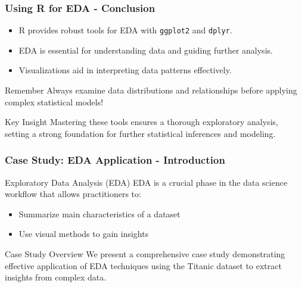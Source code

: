 \documentclass[aspectratio=169]{beamer}
\begin{document}
\begin{frame}[fragile]
    \frametitle{Using R for EDA - Conclusion}
    \begin{itemize}
        \item R provides robust tools for EDA with \texttt{ggplot2} and \texttt{dplyr}.
        \item EDA is essential for understanding data and guiding further analysis.
        \item Visualizations aid in interpreting data patterns effectively.
    \end{itemize}
    \begin{block}{Remember}
        Always examine data distributions and relationships before applying complex statistical models!
    \end{block}
    \begin{block}{Key Insight}
        Mastering these tools ensures a thorough exploratory analysis, setting a strong foundation for further statistical inferences and modeling.
    \end{block}
\end{frame}

\begin{frame}[fragile]
    \frametitle{Case Study: EDA Application - Introduction}
    \begin{block}{Exploratory Data Analysis (EDA)}
        EDA is a crucial phase in the data science workflow that allows practitioners to:
        \begin{itemize}
            \item Summarize main characteristics of a dataset
            \item Use visual methods to gain insights
        \end{itemize}
    \end{block}
    \begin{block}{Case Study Overview}
        We present a comprehensive case study demonstrating effective application of EDA techniques using the Titanic dataset to extract insights from complex data.
    \end{block}
\end{frame}
\end{document}
